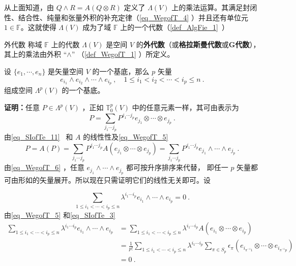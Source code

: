 从上面知道，由 $Q \wedge R=A(Q\otimes R)$ 定义了 $\Lambda(V)$ 上的乘法运算。其满足封闭性、结合性、纯量和张量外积的补充定律（\autoref{eq_WegofT_4} ）并且还有单位元 $1\in\mathbb F$。这就使得 $\Lambda(V)$ 成为了域 $\mathbb F$ 上的一个代数（\autoref{def_AlgFie_1}~）
\begin{definition}{外代数}
称域 $\mathbb F$ 上的代数 $\Lambda(V)$ 是空间 $V$ 的\textbf{外代数}（或\textbf{格拉斯曼代数}或\textbf{G代数}），其上的乘法由外积 “$\wedge$” （\autoref{def_WegofT_1} ）所定义。
\end{definition}
\begin{theorem}{}\label{the_WegofT_1}
设 $\{e_1,\cdots,e_n\}$ 是矢量空间 $V$ 的一个基底，那么 $p$ 矢量
\begin{equation}\label{eq_WegofT_8}
e_{i_1}\wedge e_{i_2}\wedge\cdots\wedge e_{i_p}~,\quad 1\leq i_1<i_2<\cdots<i_p\leq n~.
\end{equation}
组成空间 $\Lambda^p(V)$ 的一个基底。
\end{theorem}
\textbf{证明：}任意 $P\in\Lambda^p(V)$ ，正如 $\mathbb T_0^p(V)$ 中的任意元素一样，其可由表示为
\begin{equation}
P=\sum_{j_1\cdots j_p}P^{j_1\cdots j_p}e_{j_1}\otimes\cdots\otimes e_{j_p}~.
\end{equation}
由\autoref{eq_SIofTe_11}~ 和 $A$ 的线性性及\autoref{eq_WegofT_5} 
\begin{equation}
P=A(P)=\sum_{j_1\cdots j_p}P^{j_1\cdots j_p}A(e_{j_1}\otimes\cdots\otimes e_{j_p})=\sum_{j_1\cdots j_p}P^{j_1\cdots j_p}e_{j_1}\wedge\cdots\wedge e_{j_p}~.
\end{equation}
由\autoref{eq_WegofT_6}  ，任意 $e_{j_1}\wedge\cdots\wedge e_{j_p}$ 都可按升序排序来代替， 即任一 $p$ 矢量都可由形如的矢量展开。所以现在只需证明它们的线性无关即可。设


\begin{equation}
\sum_{1\leq i_1<\cdots<i_p\leq n} \lambda^{i_1\cdots i_p} e_{i_1}\wedge\cdots\wedge e_{i_p}=0~.
\end{equation}
由\autoref{eq_WegofT_5}  和\autoref{eq_SIofTe_3}~
\begin{equation}\label{eq_WegofT_7}
\begin{aligned}
\sum_{1\leq i_1<\cdots<i_p\leq n} \lambda^{i_1\cdots i_p} e_{i_1}\wedge\cdots\wedge e_{i_p}&=\sum_{1\leq i_1<\cdots<i_p\leq n} \lambda^{i_1\cdots i_p} A(e_{i_1}\otimes\cdots\otimes e_{i_p})\\
&=\frac{1}{p!}\sum_{1\leq i_1<\cdots<i_p\leq n}\lambda^{i_1\cdots i_p}\sum_{\pi\in S_p}\epsilon_\pi(e_{i_{\pi^{-1} 1}}\otimes\cdots\otimes e_{i_{\pi^{-1} p}})\\
&=0~.
\end{aligned}
\end{equation}

